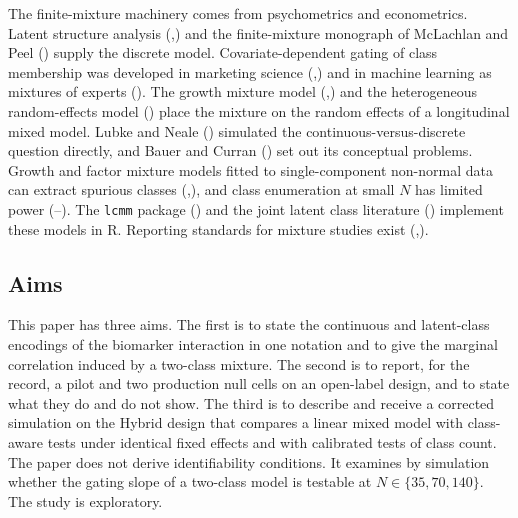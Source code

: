 \documentclass[
  11pt,
]{article}
\begin{document}
The finite-mixture machinery comes from psychometrics and
econometrics. Latent structure analysis (,) and the finite-mixture monograph of McLachlan and Peel
() supply the discrete model. Covariate-dependent
gating of class membership was developed in marketing science
(,) and in machine learning as
mixtures of experts (). The growth mixture model
(,) and the heterogeneous random-effects
model () place the mixture on the random effects
of a longitudinal mixed model. Lubke and Neale ()
simulated the continuous-versus-discrete question directly, and
Bauer and Curran () set out its conceptual problems.
Growth and factor mixture models fitted to single-component
non-normal data can extract spurious classes (,), and class enumeration at small \(N\) has limited power
(--). The \texttt{lcmm} package
() and the joint latent class literature
() implement these models in R. Reporting standards
for mixture studies exist (,).

\subsection{Aims}\label{aims}

This paper has three aims. The first is to state the continuous and
latent-class encodings of the biomarker interaction in one notation
and to give the marginal correlation induced by a two-class mixture.
The second is to report, for the record, a pilot and two production
null cells on an open-label design, and to state what they do and do
not show. The third is to describe and receive a corrected simulation
on the Hybrid design that compares a linear mixed model with
class-aware tests under identical fixed effects and with calibrated
tests of class count. The paper does not derive identifiability
conditions. It examines by simulation whether the gating slope of a
two-class model is testable at \(N \in \{35, 70, 140\}\). The study is
exploratory.
\end{document}
